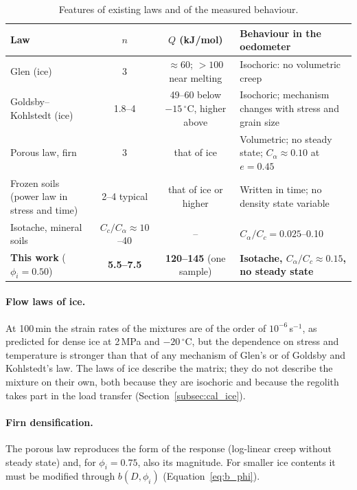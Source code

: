\begin{table}[H]
\centering
\small
\begin{tabularx}{\textwidth}{@{}p{3.6cm}cc>{\raggedright\arraybackslash}X@{}}
\toprule
Law & $n$ & $Q$ (kJ/mol) & Behaviour in the oedometer \\
\midrule
Glen (ice) & 3 & $\approx60$; $>100$ near melting & Isochoric: no volumetric creep \\
Goldsby--Kohlstedt (ice) & 1.8--4 & 49--60 below $-15\,^\circ$C, higher above & Isochoric; mechanism changes with stress and grain size \\
Porous law, firn & 3 & that of ice & Volumetric; no steady state; $C_\alpha\approx0.10$ at $e = 0.45$ \\
Frozen soils (power law in stress and time) & 2--4 typical & that of ice or higher & Written in time; no density state variable \\
Isotache, mineral soils & $C_c/C_\alpha\approx10$--40 & -- & $C_\alpha/C_c = 0.025$--0.10 \\
\textbf{This work} ($\phi_i = 0.50$) & \textbf{5.5--7.5} & \textbf{120--145} (one sample) & \textbf{Isotache, $C_\alpha/C_c\approx0.15$, no steady state} \\
\bottomrule
\end{tabularx}
\caption{Features of existing laws and of the measured behaviour.}
\label{tab:laws}
\end{table}

\paragraph{Flow laws of ice.} At 100\,min the strain rates of the mixtures are of the order of $10^{-6}$\,s$^{-1}$, as predicted for dense ice at 2\,MPa and $-20\,^\circ$C, but the dependence on stress and temperature is stronger than that of any mechanism of Glen's or of Goldsby and Kohlstedt's law. The laws of ice describe the matrix; they do not describe the mixture on their own, both because they are isochoric and because the regolith takes part in the load transfer (Section~\ref{subsec:cal_ice}).

\paragraph{Firn densification.} The porous law reproduces the form of the response (log-linear creep without steady state) and, for $\phi_i = 0.75$, also its magnitude. For smaller ice contents it must be modified through $b(D,\phi_i)$ (Equation~\eqref{eq:b_phi}).

